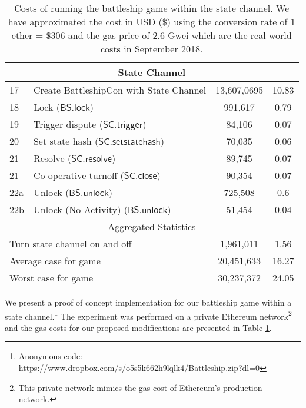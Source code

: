 \documentclass{llncs}
\newcommand{\statechanneldispute}{\mathsf{SC}.\mathsf{trigger}}
\newcommand{\statechannelsetstate}{\mathsf{SC}.\mathsf{setstatehash}}
\newcommand{\statechannelresolve}{\mathsf{SC}.\mathsf{resolve}}
\newcommand{\statechannelclose}{\mathsf{SC}.\mathsf{close}}
\newcommand{\battleshiplock}{\mathsf{BS.lock}}
\newcommand{\battleshipunlock}{\mathsf{BS.unlock}}
\begin{document}
\begin{table}
\begin{tabular}[]{l l c c}
			\hline
			\multicolumn{4}{c}{State Channel} \\
			\hline
			17 & Create BattleshipCon with State Channel & 13,607,0695 & 10.83 \\
			18 & Lock ($\battleshiplock$) & 991,617 & 0.79 \\
			19 & Trigger dispute ($\statechanneldispute$) & 84,106 & 0.07\\
			20 & Set state hash ($\statechannelsetstate$) & 70,035 & 0.06 \\
			21 & Resolve ($\statechannelresolve$) &89,745 & 0.07 \\
			21 & Co-operative turnoff ($\statechannelclose$) & 90,354 & 0.07 \\
			22a & Unlock ($\battleshipunlock$) & 725,508 & 0.6 \\
			22b & Unlock (No Activity) ($\battleshipunlock$) & 51,454 & 0.04 \\
			\hline
			\multicolumn{4}{c}{Aggregated Statistics} \\
			\hline
			\multicolumn{2}{l}{Turn state channel on and off} & 1,961,011  & 1.56 \\
			\multicolumn{2}{l}{Average case for game} & 20,451,633 & 16.27 \\
			\multicolumn{2}{l}{Worst case for game} & 30,237,372 & 24.05 \\
			\hline 
		\end{tabular}
		
		\caption{Costs of running the battleship game within the state channel. We have approximated the cost in USD (\$) using the conversion rate of 1 ether = \$306 and the gas price of 2.6 Gwei which are the real world costs in September 2018. }\label{tab:costs}
	\end{table}
	
	
	We present a proof of concept implementation for our battleship game within a state channel.\footnote{Anonymous code: https://www.dropbox.com/s/o5s5k662h9lqlk4/Battleship.zip?dl=0}
	The experiment was performed on a private Ethereum network\footnote{This private network mimics the gas cost of Ethereum's production network.} and the gas costs for our proposed modifications are presented in Table \ref{tab:costs}. 
	
\end{document}
